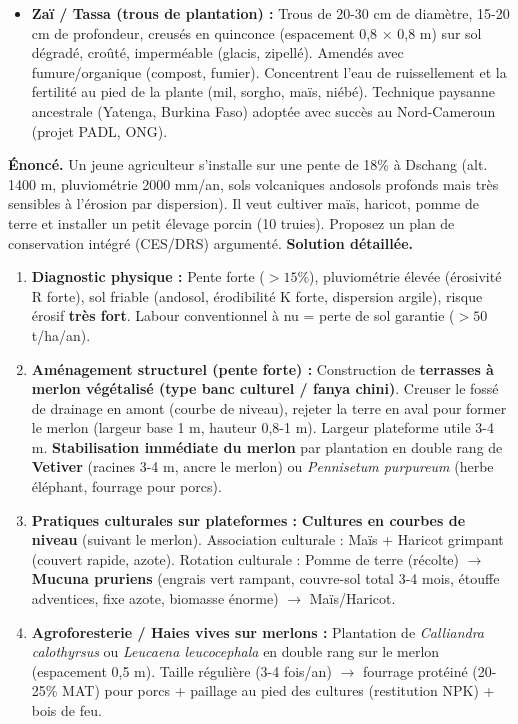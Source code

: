 \documentclass[11pt]{article}
\begin{document}
\begin{itemize}
    \item \textbf{Zaï / Tassa (trous de plantation) :} Trous de 20-30 cm de diamètre, 15-20 cm de profondeur, creusés en quinconce (espacement 0,8 $\times$ 0,8 m) sur sol dégradé, croûté, imperméable (glacis, zipellé). Amendés avec fumure/organique (compost, fumier). Concentrent l'eau de ruissellement et la fertilité au pied de la plante (mil, sorgho, maïs, niébé). Technique paysanne ancestrale (Yatenga, Burkina Faso) adoptée avec succès au Nord-Cameroun (projet PADL, ONG).
\end{itemize}

\begin{exoresolu}
\textbf{Énoncé.} Un jeune agriculteur s'installe sur une pente de 18\% à Dschang (alt. 1400 m, pluviométrie 2000 mm/an, sols volcaniques andosols profonds mais très sensibles à l'érosion par dispersion). Il veut cultiver maïs, haricot, pomme de terre et installer un petit élevage porcin (10 truies). Proposez un plan de conservation intégré (CES/DRS) argumenté.
\textbf{Solution détaillée.}
\begin{enumerate}
    \item \textbf{Diagnostic physique :} Pente forte ($>15\%$), pluviométrie élevée (érosivité R forte), sol friable (andosol, érodibilité K forte, dispersion argile), risque érosif \textbf{très fort}. Labour conventionnel à nu = perte de sol garantie ($> 50$ t/ha/an).
    \item \textbf{Aménagement structurel (pente forte) :} Construction de \textbf{terrasses à merlon végétalisé (type banc culturel / fanya chini)}. Creuser le fossé de drainage en amont (courbe de niveau), rejeter la terre en aval pour former le merlon (largeur base 1 m, hauteur 0,8-1 m). Largeur plateforme utile 3-4 m. \textbf{Stabilisation immédiate du merlon} par plantation en double rang de \textbf{Vetiver} (racines 3-4 m, ancre le merlon) ou \emph{Pennisetum purpureum} (herbe éléphant, fourrage pour porcs).
    \item \textbf{Pratiques culturales sur plateformes :} \textbf{Cultures en courbes de niveau} (suivant le merlon). Association culturale : Maïs + Haricot grimpant (couvert rapide, azote). Rotation culturale : Pomme de terre (récolte) $\rightarrow$ \textbf{Mucuna pruriens} (engrais vert rampant, couvre-sol total 3-4 mois, étouffe adventices, fixe azote, biomasse énorme) $\rightarrow$ Maïs/Haricot.
    \item \textbf{Agroforesterie / Haies vives sur merlons :} Plantation de \emph{Calliandra calothyrsus} ou \emph{Leucaena leucocephala} en double rang sur le merlon (espacement 0,5 m). Taille régulière (3-4 fois/an) $\rightarrow$ fourrage protéiné (20-25\% MAT) pour porcs + paillage au pied des cultures (restitution NPK) + bois de feu.

\end{enumerate}
\end{exoresolu}
\end{document}
